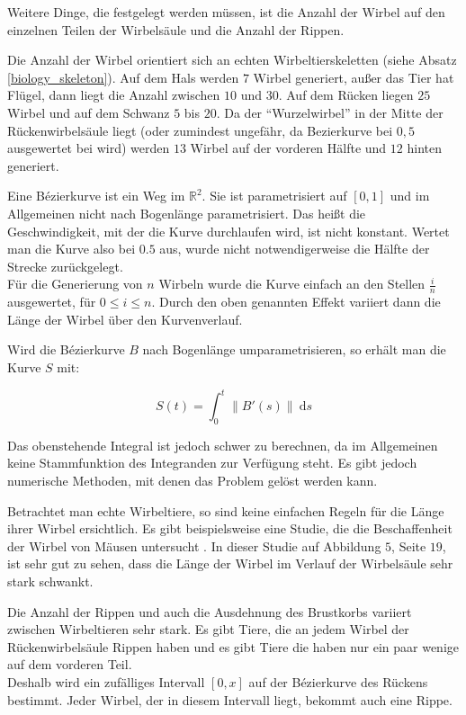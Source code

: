 Weitere Dinge, die festgelegt werden müssen, ist die Anzahl der Wirbel auf den einzelnen Teilen der Wirbelsäule und die Anzahl der Rippen.

Die Anzahl der Wirbel orientiert sich an echten Wirbeltierskeletten (siehe Absatz \ref{biology_skeleton}). Auf dem Hals werden $7$ Wirbel generiert, außer das Tier hat Flügel, dann liegt die Anzahl zwischen $10$ und $30$. Auf dem Rücken liegen $25$ Wirbel und auf dem Schwanz $5$ bis $20$.
 Da der "`Wurzelwirbel"' in der Mitte der Rückenwirbelsäule liegt (oder zumindest ungefähr, da Bezierkurve bei $0,5$ ausgewertet bei wird) werden $13$ Wirbel auf der vorderen Hälfte und $12$ hinten generiert.

Eine Bézierkurve ist ein Weg im $\mathbb{R}^2$. Sie ist parametrisiert auf $[0, 1]$ und im Allgemeinen nicht nach Bogenlänge parametrisiert. Das heißt die Geschwindigkeit, mit der die Kurve durchlaufen wird, ist nicht konstant. Wertet man die Kurve also bei $0.5$ aus, wurde nicht notwendigerweise die Hälfte der Strecke zurückgelegt.\\
Für die Generierung von $n$ Wirbeln wurde die Kurve einfach an den Stellen $\frac{i}{n}$ ausgewertet, für $0 \leq i \leq n$. Durch den oben genannten Effekt variiert dann die Länge der Wirbel über den Kurvenverlauf.

Wird die Bézierkurve $B$ nach Bogenlänge umparametrisieren, so erhält man die Kurve $S$ mit:

\[S(t) = \int_0^t \| B'(s) \| ~\mathrm{d}s \]

Das obenstehende Integral ist jedoch schwer zu berechnen, da im Allgemeinen keine Stammfunktion des Integranden zur Verfügung steht. Es gibt jedoch numerische Methoden, mit denen das Problem gelöst werden kann. \cite{ArcLengthParametrization}

Betrachtet man echte Wirbeltiere, so sind keine einfachen Regeln für die Länge ihrer Wirbel ersichtlich. Es gibt beispielsweise eine Studie, die die Beschaffenheit der  Wirbel von Mäusen untersucht \cite{MouseVertebrae}. In dieser Studie auf Abbildung $5$, Seite $19$, ist sehr gut zu sehen, dass die Länge der Wirbel im Verlauf der Wirbelsäule sehr stark schwankt.



Die Anzahl der Rippen und auch die Ausdehnung des Brustkorbs variiert zwischen Wirbeltieren sehr stark. Es gibt Tiere, die an jedem Wirbel der Rückenwirbelsäule Rippen haben und es gibt Tiere die haben nur ein paar wenige auf dem vorderen Teil.
\\
Deshalb wird ein zufälliges Intervall $[0, x]$ auf der Bézierkurve des Rückens bestimmt. Jeder Wirbel, der in diesem Intervall liegt, bekommt auch eine Rippe.


